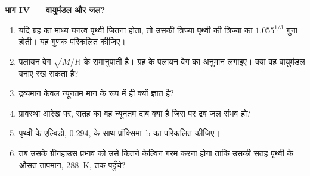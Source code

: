 \begin{problem}
\medskip
\noindent\textbf{भाग IV --- वायुमंडल और जल?}
\begin{enumerate}[resume]
  \item यदि ग्रह का माध्य घनत्व पृथ्वी जितना होता, तो उसकी त्रिज्या पृथ्वी की त्रिज्या का
        $1.055^{1/3}$ गुना होती। यह गुणक परिकलित कीजिए।
  \item पलायन वेग $\sqrt{M/R}$ के समानुपाती है। ग्रह के पलायन वेग का
        अनुमान लगाइए। क्या वह वायुमंडल बनाए रख सकता है?
  \item द्रव्यमान केवल न्यूनतम मान के रूप में ही क्यों ज्ञात है?
  \item प्रावस्था आरेख पर, सतह का वह न्यूनतम दाब क्या है जिस पर द्रव जल संभव
        हो?
  \item पृथ्वी के एल्बिडो, 0.294, के साथ प्रॉक्सिमा~b का  परिकलित
        कीजिए।
  \item तब उसके ग्रीनहाउस प्रभाव को उसे कितने केल्विन गरम करना होगा ताकि उसकी सतह
        पृथ्वी के औसत तापमान,
        \qty{288}{K}, तक पहुँचे?
\end{enumerate}
\end{problem}
